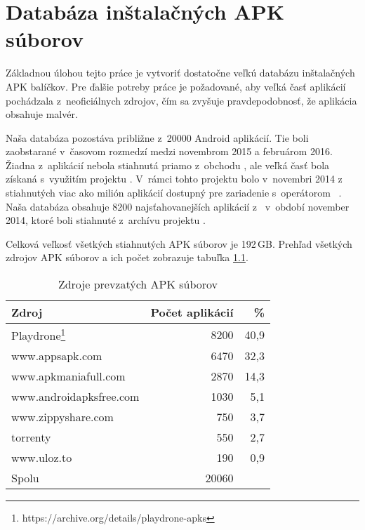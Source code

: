 \chapter{Databáza inštalačných APK súborov}
Základnou úlohou tejto práce je vytvoriť dostatočne veľkú databázu inštalačných APK balíčkov. Pre ďalšie potreby práce je požadované, aby veľká časť aplikácií pochádzala z~neoficiálnych zdrojov, čím sa zvyšuje pravdepodobnosť, že aplikácia obsahuje malvér.

Naša databáza pozostáva približne z~20000 Android aplikácií. Tie boli zaobstarané v~časovom rozmedzí medzi novembrom 2015 a februárom 2016. Žiadna z~aplikácií nebola stiahnutá priamo z~obchodu , ale veľká časť bola získaná s~využitím projektu . V~rámci tohto projektu bolo v~novembri 2014 z~ stiahnutých viac ako milión aplikácií dostupný pre zariadenie  s~operátorom ~\cite{Viennot2014}. Naša databáza obsahuje 8200 najsťahovanejších aplikácií z~ v~období november 2014, ktoré boli stiahnuté z~archívu projektu .

Celková veľkosť všetkých stiahnutých APK súborov je 192\,GB. Prehľad všetkých zdrojov APK súborov a ich počet zobrazuje tabuľka \ref{tab:stahovanie}. 

\begin{table}[htb]
\centering
  \begin{tabular}{|l r r|}
    \hline
    \textbf{Zdroj} & \textbf{Počet aplikácií} & \textbf{\%} \\\hline\hline
    Playdrone\footnote{https://archive.org/details/playdrone-apks} & 8200 & 40,9\\
    www.appsapk.com & 6470 & 32,3\\
    www.apkmaniafull.com & 2870 & 14,3\\
    www.androidapksfree.com & 1030 & 5,1\\
    www.zippyshare.com & 750 & 3,7\\
    torrenty & 550 & 2,7\\
    www.uloz.to & 190 & 0,9\\
    \midrule\hline
    Spolu & 20060 & \\
    \hline
  \end{tabular}
  \caption{Zdroje prevzatých APK súborov}
  \label{tab:stahovanie}
\end{table}


